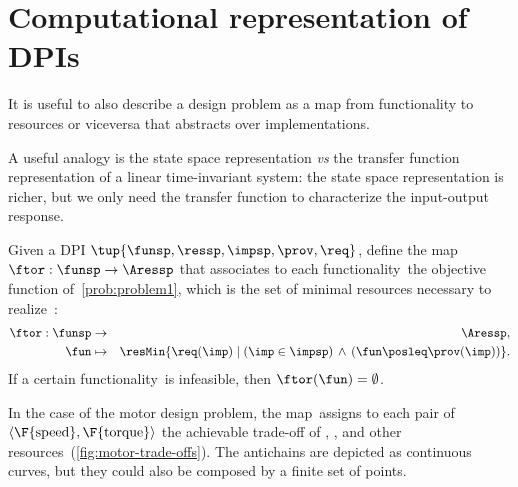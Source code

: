 

\section{Computational representation of DPIs}
\label{sec:solving-representation-of-dpis}



It is useful to also describe a design problem as a map from functionality to resources or viceversa that abstracts over implementations.

A useful analogy is the state space representation \emph{vs} the transfer function representation of a linear time-invariant system: the state space representation is richer, but we only need the transfer function to characterize the input-output response.


\begin{definition}
  \label{def:ftor}
  Given a DPI $\tup{ \funsp,\ressp,\impsp,\prov,\req} $,
  define the map~$\ftor:\funsp\rightarrow\Aressp$ that associates
  to each functionality~\fun the objective function of~\cref{prob:problem1},
  which is the set of minimal resources necessary to realize~\fun:
  \begin{eqnarray*}
    \ftor:\funsp & \rightarrow & \Aressp,\\
    \fun& \mapsto & \resMin\{\req(\imp)\mid\left(\imp\in\impsp\right)\,\wedge\,\left(\fun\posleq\prov(\imp)\right)\}.
  \end{eqnarray*}
  If a certain functionality~\fun is infeasible, then $\ftor(\fun)=\emptyset$.
\end{definition}



\begin{example}
  In the case of the motor design problem, the map~\ftor assigns
  to each pair of $\left\langle \F{\text{speed}},\F{\text{torque}}\right\rangle $
  the achievable trade-off of , , and other resources~(\cref{fig:motor-trade-offs}).
  The antichains are depicted as continuous curves, but they could also
  be composed by a finite set of points.

\end{example}

